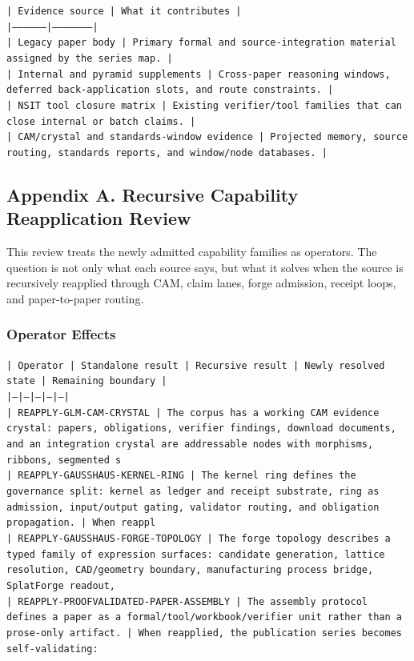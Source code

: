 \documentclass[11pt]{article}
\begin{document}
\noindent\texttt{| Evidence source | What it contributes |}\\
\noindent\texttt{|-----------------|---------------------|}\\
\noindent\texttt{| Legacy paper body | Primary formal and source-integration material assigned by the series map. |}\\
\noindent\texttt{| Internal and pyramid supplements | Cross-paper reasoning windows, deferred back-application slots, and route constraints. |}\\
\noindent\texttt{| NSIT tool closure matrix | Existing verifier/tool families that can close internal or batch claims. |}\\
\noindent\texttt{| CAM/crystal and standards-window evidence | Projected memory, source routing, standards reports, and window/node databases. |}\\

\subsection*{Appendix A. Recursive Capability Reapplication Review}

This review treats the newly admitted capability families as operators. The question is not only what each source says, but what it solves when the source is recursively reapplied through CAM, claim lanes, forge admission, receipt loops, and paper-to-paper routing.

\subsubsection*{Operator Effects}

\noindent\texttt{| Operator | Standalone result | Recursive result | Newly resolved state | Remaining boundary |}\\
\noindent\texttt{|---|---|---|---|---|}\\
\noindent\texttt{| REAPPLY-GLM-CAM-CRYSTAL | The corpus has a working CAM evidence crystal: papers, obligations, verifier findings, download documents, and an integration crystal are addressable nodes with morphisms, ribbons, segmented s}\\
\noindent\texttt{| REAPPLY-GAUSSHAUS-KERNEL-RING | The kernel ring defines the governance split: kernel as ledger and receipt substrate, ring as admission, input/output gating, validator routing, and obligation propagation. | When reappl}\\
\noindent\texttt{| REAPPLY-GAUSSHAUS-FORGE-TOPOLOGY | The forge topology describes a typed family of expression surfaces: candidate generation, lattice resolution, CAD/geometry boundary, manufacturing process bridge, SplatForge readout, }\\
\noindent\texttt{| REAPPLY-PROOFVALIDATED-PAPER-ASSEMBLY | The assembly protocol defines a paper as a formal/tool/workbook/verifier unit rather than a prose-only artifact. | When reapplied, the publication series becomes self-validating:}\\
\end{document}
